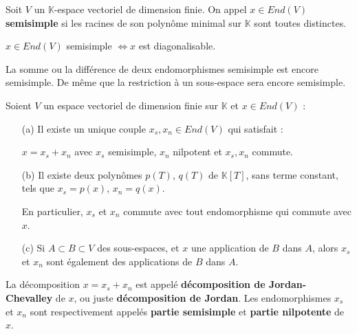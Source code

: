 \documentclass[a4paper,openany,12pt]{report}
\newcommand{\KK}{\mathbb{K}}
\theoremstyle{break}
{\theorembodyfont{\upshape}
\newtheorem*{rmq}{Remarque :}
\newtheorem*{prv}{Preuve :}
\newtheorem*{ex}{Exemples :}
\newtheorem*{exe}{Exemple : }
\newtheorem*{nota}{Notation :}
\newtheorem*{dem}{D\'emonstration :}}
\begin{document}
\begin{df}
\quad Soit $V$ un $\KK$-espace vectoriel de dimension finie. On appel $x \in End(V)$ \textbf{semisimple} si les racines de son polynôme minimal sur $\KK$ sont toutes distinctes. 
\end{df}

\begin{prop}
\quad $x \in End(V)$ semisimple $\iff x$ est diagonalisable. 
\end{prop}

\begin{rmq}
\quad La somme ou la différence de deux endomorphismes semisimple est encore semisimple. De même que la restriction à un sous-espace sera encore semisimple.
\end{rmq}

\begin{prop}\label{prop:C1}
\quad Soient $V$ un espace vectoriel de dimension finie sur $\KK$ et $x \in End(V)$ :
\begin{itemize}
\item[(a)] Il existe un unique couple $x_{s},x_{n} \in End(V)$ qui satisfait :
\begin{center}
$x=x_{s}+x_{n}$ avec $x_{s}$ semisimple, $x_{n}$ nilpotent et $x_{s},x_{n}$ commute.
\end{center}

\item[(b)] Il existe deux polynômes $p(T)$, $q(T)$ de $\KK[T]$, sans terme constant, tels que $x_{s}=p(x)$, $x_{n} = q(x)$. 

En particulier, $x_{s}$ et $x_{n}$ commute avec tout endomorphisme qui commute avec $x$.

\item[(c)] Si $A \subset B \subset V$ des sous-espaces, et $x$ une application de $B$ dans $A$, alors $x_{s}$ et $x_{n}$ sont également des applications de $B$ dans $A$. 
\end{itemize}
\end{prop}

\begin{df}
\quad La décomposition $x = x_{s}+x_{n}$ est appelé \textbf{décomposition de Jordan-Chevalley} de $x$, ou juste \textbf{décomposition de Jordan}. Les endomorphismes $x_{s}$ et $x_{n}$ sont respectivement appelés \textbf{partie semisimple} et \textbf{partie nilpotente} de $x$.
\end{df}
\end{document}
